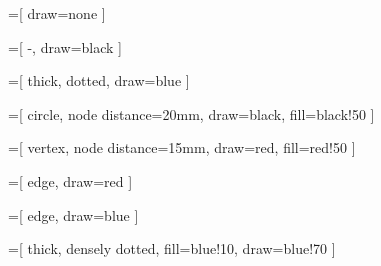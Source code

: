 
=[
	draw=none
]

=[
	-,
	draw=black
]

=[
	thick,
	dotted,
	draw=blue
]

=[
	circle,
	node distance=20mm,
	draw=black,
	fill=black!50
]

=[
	vertex,
	node distance=15mm,
	draw=red,
	fill=red!50
]

=[
	edge,
	draw=red
]

=[
	edge,
	draw=blue
]

=[
	thick, %
	densely dotted,
	fill=blue!10,
	draw=blue!70
]

